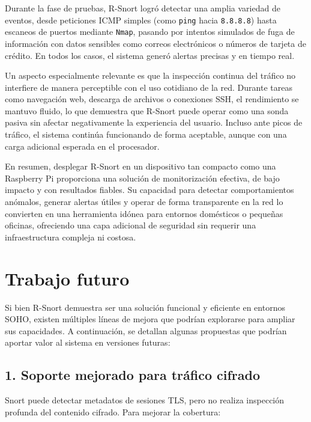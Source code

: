 \documentclass[11pt,a4paper,twoside]{report}
\begin{document}
Durante la fase de pruebas, R-Snort logró detectar una amplia variedad de eventos, desde peticiones ICMP simples (como \texttt{ping} hacia \texttt{8.8.8.8}) hasta escaneos de puertos mediante \texttt{Nmap}, pasando por intentos simulados de fuga de información con datos sensibles como correos electrónicos o números de tarjeta de crédito. En todos los casos, el sistema generó alertas precisas y en tiempo real.\newline

Un aspecto especialmente relevante es que la inspección continua del tráfico no interfiere de manera perceptible con el uso cotidiano de la red. Durante tareas como navegación web, descarga de archivos o conexiones SSH, el rendimiento se mantuvo fluido, lo que demuestra que R-Snort puede operar como una sonda pasiva sin afectar negativamente la experiencia del usuario. Incluso ante picos de tráfico, el sistema continúa funcionando de forma aceptable, aunque con una carga adicional esperada en el procesador.\newline

En resumen, desplegar R-Snort en un dispositivo tan compacto como una Raspberry Pi proporciona una solución de monitorización efectiva, de bajo impacto y con resultados fiables. Su capacidad para detectar comportamientos anómalos, generar alertas útiles y operar de forma transparente en la red lo convierten en una herramienta idónea para entornos domésticos o pequeñas oficinas, ofreciendo una capa adicional de seguridad sin requerir una infraestructura compleja ni costosa.

\chapter*{Trabajo futuro}

Si bien R-Snort demuestra ser una solución funcional y eficiente en entornos SOHO, existen múltiples líneas de mejora que podrían explorarse para ampliar sus capacidades. A continuación, se detallan algunas propuestas que podrían aportar valor al sistema en versiones futuras:

\section*{1. Soporte mejorado para tráfico cifrado}

Snort puede detectar metadatos de sesiones TLS, pero no realiza inspección profunda del contenido cifrado. Para mejorar la cobertura:
\end{document}
